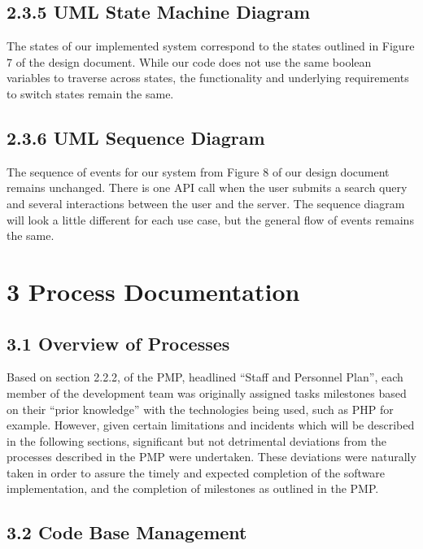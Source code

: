 \documentclass[]{article}
\begin{document}
\subsection{\textbf{2.3.5 UML State Machine
Diagram}}\label{uml-state-machine-diagram}

The states of our implemented system correspond to the states outlined
in Figure 7 of the design document. While our code does not use the same
boolean variables to traverse across states, the functionality and
underlying requirements to switch states remain the same.

\subsection{\textbf{2.3.6 UML Sequence
Diagram}}\label{uml-sequence-diagram}

The sequence of events for our system from Figure 8 of our design
document remains unchanged. There is one API call when the user submits
a search query and several interactions between the user and the server.
The sequence diagram will look a little different for each use case, but
the general flow of events remains the same.

\section{\textbf{3 Process Documentation}}\label{process-documentation}

\subsection{\textbf{3.1 Overview of
Processes}}\label{overview-of-processes}

Based on section 2.2.2, of the PMP, headlined ``Staff and Personnel
Plan'', each member of the development team was originally assigned
tasks milestones based on their ``prior knowledge'' with the
technologies being used, such as PHP for example. However, given certain
limitations and incidents which will be described in the following
sections, significant but not detrimental deviations from the processes
described in the PMP were undertaken. These deviations were naturally
taken in order to assure the timely and expected completion of the
software implementation, and the completion of milestones as outlined in
the PMP.

\subsection{\textbf{3.2 Code Base
Management}}\label{code-base-management}
\end{document}
